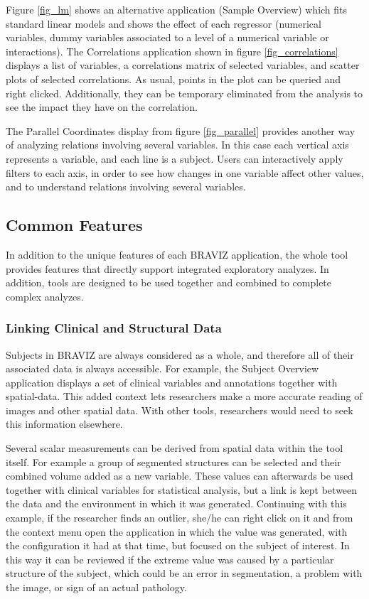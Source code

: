 \documentclass[twocolumn]{svjour3}
\begin{document}
Figure \ref{fig_lm} shows an alternative application (Sample Overview) which fits standard linear models and shows the effect of each regressor (numerical variables, dummy variables associated to a level of a numerical variable or interactions). The Correlations application shown in figure \ref{fig_correlations} displays a list of variables, a correlations matrix of selected variables, and scatter plots of selected correlations. As usual, points in the plot can be queried and right clicked. Additionally, they can be temporary eliminated from the analysis to see the impact they have on the correlation. 

The Parallel Coordinates display from figure \ref{fig_parallel} provides another way of analyzing relations involving several variables. In this case each vertical axis represents a variable, and each line is a subject. Users can interactively apply filters to each axis, in order to see how changes in one variable affect other values, and to understand relations involving several variables.

\subsection{Common Features}

In addition to the unique features of each BRAVIZ application, the whole tool provides features that directly support integrated exploratory analyzes. In addition, tools are designed to be used together and combined to complete complex analyzes.

\subsubsection{Linking Clinical and Structural Data}

Subjects in BRAVIZ are always considered as a whole, and therefore all of their associated data is always accessible. For example, the Subject Overview application displays a set of clinical variables and annotations together with spatial-data. This added context lets researchers make a more accurate reading of images and other spatial data. With other tools, researchers would need to seek this information elsewhere. 

Several scalar measurements can be derived from spatial data within the tool itself. For example a group of segmented structures can be selected and their combined volume added as a new variable. These values can afterwards be used together with clinical variables for statistical analysis, but a link is kept between the data and the environment in which it was generated. Continuing with this example, if the researcher finds an outlier, she/he can right click on it and from the context menu open the application in which the value was generated, with the configuration it had at that time, but focused on the subject of interest. In this way it can be reviewed if the extreme value was caused by a particular structure of the subject, which could be an error in segmentation, a problem with the image, or sign of an actual pathology.
\end{document}
